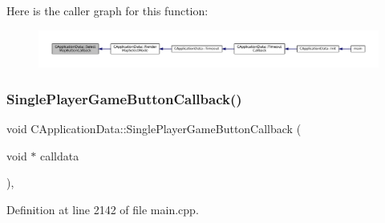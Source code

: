 Here is the caller graph for this function\+:
\nopagebreak
\begin{figure}[H]
\begin{center}
\leavevmode
\includegraphics[width=350pt]{classCApplicationData_a5f915dc03205b67ca79f4dcfd7b43f5a_icgraph}
\end{center}
\end{figure}
\hypertarget{classCApplicationData_a239a28599cbb6762c21306a4a03c6202}{}\label{classCApplicationData_a239a28599cbb6762c21306a4a03c6202} 
\subsubsection{\texorpdfstring{Single\+Player\+Game\+Button\+Callback()}{SinglePlayerGameButtonCallback()}}
{\footnotesize\ttfamily void C\+Application\+Data\+::\+Single\+Player\+Game\+Button\+Callback (\begin{DoxyParamCaption}\item[{void $\ast$}]{calldata }\end{DoxyParamCaption})\hspace{0.3cm}{\ttfamily [static]}, {\ttfamily [protected]}}



Definition at line 2142 of file main.\+cpp.


